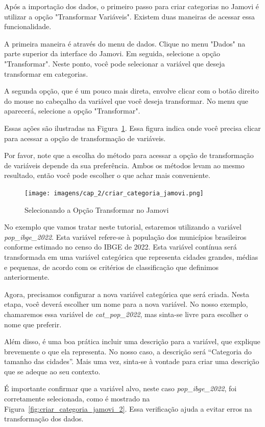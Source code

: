 Após a importação dos dados, o primeiro passo para criar categorias no Jamovi é utilizar a opção "Transformar Variáveis". Existem duas maneiras de acessar essa funcionalidade.

A primeira maneira é através do menu de dados. Clique no menu "Dados" na parte superior da interface do Jamovi. Em seguida, selecione a opção "Transformar". Neste ponto, você pode selecionar a variável que deseja transformar em categorias.

A segunda opção, que é um pouco mais direta, envolve clicar com o botão direito do mouse no cabeçalho da variável que você deseja transformar. No menu que aparecerá, selecione a opção "Transformar".

Essas ações são ilustradas na Figura~\ref{fig:criar_categoria_jamovi}. Essa figura indica onde você precisa clicar para acessar a opção de transformação de variáveis.

Por favor, note que a escolha do método para acessar a opção de transformação de variáveis depende da sua preferência. Ambos os métodos levam ao mesmo resultado, então você pode escolher o que achar mais conveniente.

\begin{figure}[H]
    \centering
    \caption{Selecionando a Opção Transformar no Jamovi}
    \texttt{[image: imagens/cap\_2/criar\_categoria\_jamovi.png]}
    \label{fig:criar_categoria_jamovi}
\end{figure}

No exemplo que vamos tratar neste tutorial, estaremos utilizando a variável \textit{pop\_ibge\_2022}. Esta variável refere-se à população dos municípios brasileiros conforme estimado no censo do IBGE de 2022. Esta variável contínua será transformada em uma variável categórica que representa cidades grandes, médias e pequenas, de acordo com os critérios de classificação que definimos anteriormente.

Agora, precisamos configurar a nova variável categórica que será criada. Nesta etapa, você deverá escolher um nome para a nova variável. No nosso exemplo, chamaremos essa variável de \textit{cat\_pop\_2022}, mas sinta-se livre para escolher o nome que preferir. 

Além disso, é uma boa prática incluir uma descrição para a variável, que explique brevemente o que ela representa. No nosso caso, a descrição será ``Categoria do tamanho das cidades''. Mais uma vez, sinta-se à vontade para criar uma descrição que se adeque ao seu contexto.

É importante confirmar que a variável alvo, neste caso \textit{pop\_ibge\_2022}, foi corretamente selecionada, como é mostrado na Figura~\ref{fig:criar_categoria_jamovi_2}. Essa verificação ajuda a evitar erros na transformação dos dados.

